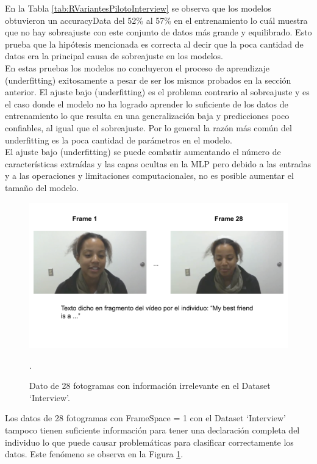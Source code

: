 \begin{onehalfspacing}
En la Tabla \ref{tab:RVariantesPilotoInterview} se observa que los modelos obtuvieron un accuracyData del 52\% al 57\% en el entrenamiento lo cuál muestra que no hay sobreajuste con este conjunto de datos más grande y equilibrado. Esto prueba que la hipótesis mencionada es correcta al decir que la poca cantidad de datos era la principal causa de sobreajuste en los modelos.\\

En estas pruebas los modelos no concluyeron el proceso de aprendizaje (underfitting) exitosamente a pesar de ser los mismos probados en la sección anterior. El ajuste bajo (underfitting) es el problema contrario al sobreajuste y es el caso donde el modelo no ha logrado aprender lo suficiente de los datos de entrenamiento lo que resulta en una generalización baja y predicciones poco confiables, al igual que el sobreajuste. Por lo general la razón más común del underfitting es la poca cantidad de parámetros en el modelo.\\

El ajuste bajo (underfitting) se puede combatir aumentando el número de características extraídas y las capas ocultas en la MLP pero debido a las entradas y a las operaciones  y limitaciones computacionales, no es posible aumentar el tamaño del modelo.

\begin{figure}[h!]
	\centering
	\includegraphics[width=14cm,keepaspectratio]{XX_Figures/TextoFragmento28FramesD2.png}
	\caption{\footnotesize Dato de 28 fotogramas con información irrelevante en el Dataset `Interview'.}.
	\label{fig:TextoFragmento28FramesD2}
\end{figure}

Los datos de 28 fotogramas con FrameSpace = 1 con el Dataset `Interview' tampoco tienen suficiente información para tener una declaración completa del individuo lo que puede causar problemáticas para clasificar correctamente los datos. Este fenómeno se observa en la Figura \ref{fig:TextoFragmento28FramesD2}.


\end{onehalfspacing}
